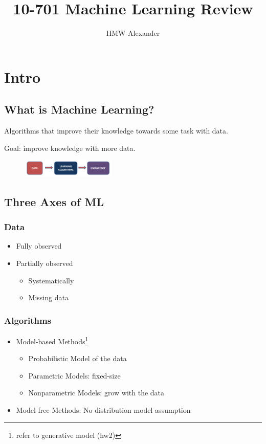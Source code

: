 \documentclass[letterpaper, 10pt, twocolumn]{article}
\title{\textbf{10-701 Machine Learning Review}}
\author{HMW-Alexander}
\begin{document}
\maketitle

\section{Intro}

\subsection{What is Machine Learning?}

Algorithms that improve their knowledge towards some task with data.

Goal: improve knowledge with more data.

\begin{figure}[!h]
	\centering
	\includegraphics[width=0.4\textwidth]{./img/01_intro/machinelearning.png}
\end{figure}

\subsection{Three Axes of ML}

\subsubsection{Data}

\begin{itemize}
	\item Fully observed
	\item Partially observed
	\begin{itemize}
		\item Systematically
		\item Missing data
	\end{itemize}
\end{itemize}

\subsubsection{Algorithms}

\begin{itemize}
	\item Model-based Methods\footnote{refer to generative model (hw2)}
	\begin{itemize}
		\item Probabilistic Model of the data
		\item Parametric Models: fixed-size
		\item Nonparametric Models:	grow with the data
	\end{itemize}
	\item Model-free Methods: No distribution model assumption
\end{itemize}
\end{document}
